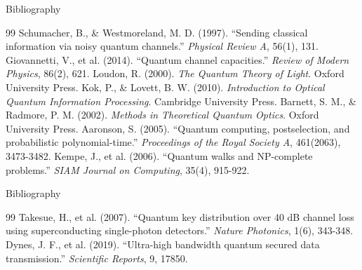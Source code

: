 \documentclass[10pt]{beamer}
\begin{document}
\begin{frame}{Bibliography}
\begin{thebibliography}{99}
\bibitem{} Schumacher, B., \& Westmoreland, M. D. (1997). ``Sending classical information via noisy quantum channels.'' \textit{Physical Review A}, 56(1), 131.
\bibitem{} Giovannetti, V., et al. (2014). ``Quantum channel capacities.'' \textit{Review of Modern Physics}, 86(2), 621.
\bibitem{}Loudon, R. (2000). \textit{The Quantum Theory of Light}. Oxford University Press.
\bibitem{}Kok, P., \& Lovett, B. W. (2010). \textit{Introduction to Optical Quantum Information Processing}. Cambridge University Press.
\bibitem{} Barnett, S. M., \& Radmore, P. M. (2002). \textit{Methods in Theoretical Quantum Optics}. Oxford University Press.
\bibitem{} Aaronson, S. (2005). ``Quantum computing, postselection, and probabilistic polynomial-time.'' \textit{Proceedings of the Royal Society A}, 461(2063), 3473-3482.
\bibitem{} Kempe, J., et al. (2006). ``Quantum walks and NP-complete problems.'' \textit{SIAM Journal on Computing}, 35(4), 915-922.
\end{thebibliography}
\end{frame}

\begin{frame}{Bibliography}
\begin{thebibliography}{99}
\bibitem{} Takesue, H., et al. (2007). ``Quantum key distribution over 40 dB channel loss using superconducting single-photon detectors.'' \textit{Nature Photonics}, 1(6), 343-348.
\bibitem{} Dynes, J. F., et al. (2019). ``Ultra-high bandwidth quantum secured data transmission.'' \textit{Scientific Reports}, 9, 17850.

\end{thebibliography}
\end{frame}
\end{document}
